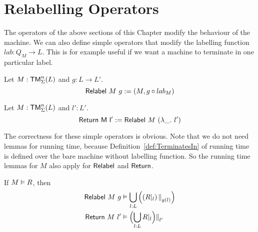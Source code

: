 \section{Relabelling Operators}
\label{sec:labelling-op}
%

The operators of the above sections of this Chapter modify the behaviour of the machine.  We can also define simple operators that modify the
labelling function $lab : Q_M \to L$.  This is for example useful if we want a machine to terminate in one particular label.

\begin{definition}[$\MS{Relabel}$][Relabel]
  Let $M:\mathsf{TM}_\Sigma^n(L)$ and $g : L \to L'$.
  \[
    \mathsf{Relabel}~M~g := \left(M, g \circ lab_M\right)
  \]
\end{definition}

\begin{definition}[$\MS{Return}$][Return]
  Let $M:\mathsf{TM}_\Sigma^n(L)$ and $l':L'$.
  \[
    \mathsf{Return~M~l'} := \mathsf{Relabel}~M~(\lambda \_.~l')
  \]
\end{definition}

The correctness for these simple operators is obvious.  Note that we do not need lemmas for running time, because Definition~\ref{def:TerminatesIn} of
running time is defined over the bare machine without labelling function.  So the running time lemmas for $M$ also apply for $\MS{Relabel}$ and
$\MS{Return}$.
\begin{lemma}
  If $M \mathrel{\vDash} R$, then
  \begin{alignat*}{1}
    \mathsf{Relabel}~M~g & \mathrel{\vDash} \bigcup_{l:L} \left( \left(R {|}_{l}\right) {|\mkern-1.5mu|}_{g(l)} \right) \\
    \mathsf{Return}~M~l'         & \mathrel{\vDash} \Bigl( \bigcup_{l:L} R {|}_{l} \Bigr) {|\mkern-1.5mu|}_{l'}
  \end{alignat*}
\end{lemma}


